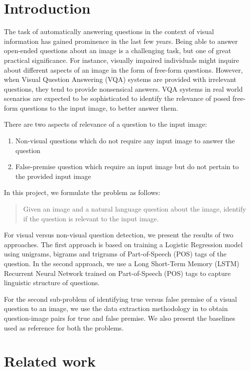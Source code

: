\section{Introduction}
The task of automatically answering questions in the context of visual information has gained prominence in the last few years. Being able to answer open-ended questions about an image is a challenging task, but one of great practical significance. For instance, visually impaired individuals might inquire about different aspects of an image in the form of free-form questions. However, when Visual Question Answering (VQA) systems are provided with irrelevant questions, they tend to provide nonsensical answers. VQA systems in real world scenarios are expected to be sophisticated to identify the relevance of posed free-form questions to the input image, to better answer them. 

There are two aspects of relevance of a question to the input image:
\begin{enumerate}
\item Non-visual questions which do not require any input image to answer the question
\item False-premise question which require an input image but do not pertain to the provided input image \\
\end{enumerate}
In this project, we formulate the problem as follows:
\begin{quotation}
\noindent Given an image and a natural language question about the image, identify if the question is relevant to the input image.
\end{quotation}
For visual versus non-visual question detection, we present the results of two approaches. The first approach is based on training a Logistic Regression model using unigrams, bigrams and trigrams of Part-of-Speech (POS) tags of the question. In the second approach, we use a Long Short-Term Memory (LSTM) Recurrent Neural Network trained on Part-of-Speech (POS) tags to capture linguistic structure of questions. 

For the second sub-problem of identifying true versus false premise of a visual question to an image, we use the data extraction methodology in \cite{mahendru2017promise} to obtain question-image pairs for true and false premise. We also present the baselines used as reference for both the problems.

\section{Related work}

